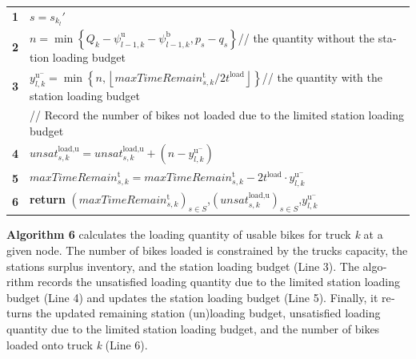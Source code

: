 \documentclass[
  english,
]{article}
\newcounter{none} %
\begin{document}
\begin{otherlanguage}{english}
\protect{}\label{t0055}
{\def\LTcaptype{none} %
\begin{longtable}[]{@{}ll@{}}
\toprule\noalign{}
\multicolumn{2}{@{}l@{}}{%
\textbf{Algorithm 6:}
\(assignLoadU\left( {r_{k}',l,\left( {\mathit{maxTimeRemai}n_{s,k}^{\text{t}}} \right)_{s \in S},\left( {\mathit{unsa}t_{s,k}^{\text{load,u}}} \right)_{s \in S}} \right)\)} \\
\midrule\noalign{}
\endhead
\bottomrule\noalign{}
\endlastfoot
\textbf{1} & \(s = s_{k_{l}}'\) \\
\textbf{2} &
\(n = \min\left\{ \left. {Q_{k} - \psi_{l - 1,k}^{\text{u}} - \psi_{l - 1,k}^{\text{b}},p_{s} - q_{s}} \right\} \right.\)//
the quantity without the station loading budget \\
\textbf{3} &
\(y_{l,k}^{\text{u}^{-}} = \min\left\{ \left. {n,\left\lfloor \mathit{maxTimeRemai}n_{s,k}^{\text{t}}/2t^{\text{load}} \right\rfloor} \right\} \right.\)//
the quantity with the station loading budget \\
& // Record the number of bikes not loaded due to the limited station loading budget \\
\textbf{4} &
\(\mathit{unsa}t_{s,k}^{\text{load,u}} = unsat_{s,k}^{\text{load,u}} + \left( {n - y_{l,k}^{\text{u}^{-}}} \right)\) \\
\textbf{5} &
\(\mathit{maxTimeRemai}n_{s,k}^{\text{t}} = maxTimeRemain_{s,k}^{\text{t}} - 2t^{\text{load}} \cdot y_{l,k}^{\text{u}^{-}}\) \\
\textbf{6} & \textbf{return}
\(\left( {\mathit{maxTimeRemai}n_{s,k}^{\text{t}}} \right)_{s \in S}\),\(\left( {\mathit{unsa}t_{s,k}^{\text{load,u}}} \right)_{s \in S}\),\(y_{l,k}^{\text{u}^{-}}\) \\
\end{longtable}
}

\textbf{Algorithm 6} calculates the loading quantity of usable bikes for truck \emph{k} at a given
node. The number of bikes loaded is constrained by the truck\textquotesingle s capacity, the
station\textquotesingle s surplus inventory, and the station loading budget (Line 3). The algorithm
records the unsatisfied loading quantity due to the limited station loading budget (Line 4) and
updates the station loading budget (Line 5). Finally, it returns the updated remaining station
(un)loading budget, unsatisfied loading quantity due to the limited station loading budget, and the
number of bikes loaded onto truck \emph{k} (Line 6).


\end{otherlanguage}
\end{document}
